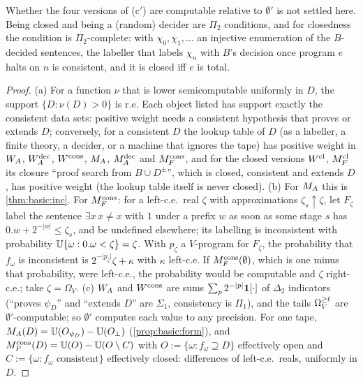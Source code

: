 Whether the four versions of (c$'$) are computable relative to $\emptyset'$ is not settled here. Being closed and being a (random) decider are $\Pi_2$ conditions, and for closedness the condition is $\Pi_2$-complete: with $\chi_0,\chi_1,\dots$ an injective enumeration of the $B$-decided sentences, the labeller that labels $\chi_n$ with $B$'s decision once program $e$ halts on $n$ is consistent, and it is closed iff $e$ is total.

\begin{proof}
(a) For a function $\nu$ that is lower semicomputable uniformly in $D$, the support $\{D:\nu(D)>0\}$ is r.e. Each object listed has support exactly the consistent data sets: positive weight needs a consistent hypothesis that proves or extends $D$; conversely, for a consistent $D$ the lookup table of $D$ (as a labeller, a finite theory, a decider, or a machine that ignores the tape) has positive weight in $W_{A}$, $W_{A}^{\mathrm{dec}}$, $W^{\mathrm{cons}}$, $M_{A}$, $M_{A}^{\mathrm{dec}}$ and $M_{F}^{\mathrm{cons}}$, and for the closed versions $W^{\mathrm{cl}}$, $M_{F}^{\mathrm{cl}}$ its closure ``proof search from $B\cup D^\pm$'', which is closed, consistent and extends $D$, has positive weight (the lookup table itself is never closed).
(b) For $M_{A}$ this is \cref{thm:basic:inc}. For $M_{F}^{\mathrm{cons}}$: for a left-c.e.\ real $\zeta$ with approximations $\zeta_s\uparrow\zeta$, let $F_\zeta$ label the sentence $\exists x\,x\ne x$ with $1$ under a prefix $w$ as soon as some stage $s$ has $0.w+2^{-\lvert w\rvert}\le\zeta_s$, and be undefined elsewhere; its labelling is inconsistent with probability $\mathbb{U}\{\omega:0.\omega<\zeta\}=\zeta$. With $p_\zeta$ a $V$-program for $F_\zeta$, the probability that $f_\omega$ is inconsistent is $2^{-\lvert p_\zeta\rvert}\zeta+\kappa$ with $\kappa$ left-c.e. If $M_{F}^{\mathrm{cons}}(\emptyset)$, which is one minus that probability, were left-c.e., the probability would be computable and $\zeta$ right-c.e.; take $\zeta=\Omega_V$.
(c) $W_{A}$ and $W^{\mathrm{cons}}$ are sums $\sum_p2^{-\lvert p\rvert}\mathbf{1}[\cdot]$ of $\Delta_2$ indicators (``proves $\psi_D$'' and ``extends $D$'' are $\Sigma_1$, consistency is $\Pi_1$), and the tails $\Omega_{V}^{\ge \ell}$ are $\emptyset'$-computable; so $\emptyset'$ computes each value to any precision. For one tape, $M_{A}(D)=\mathbb{U}(O_{\psi_D})-\mathbb{U}(O_\bot)$ (\cref{prop:basic:form}), and $M_{F}^{\mathrm{cons}}(D)=\mathbb{U}(O)-\mathbb{U}(O\setminus C)$ with $O:=\{\omega:f_\omega\supseteq D\}$ effectively open and $C:=\{\omega:f_\omega\text{ consistent}\}$ effectively closed: differences of left-c.e.\ reals, uniformly in $D$.

\end{proof}
